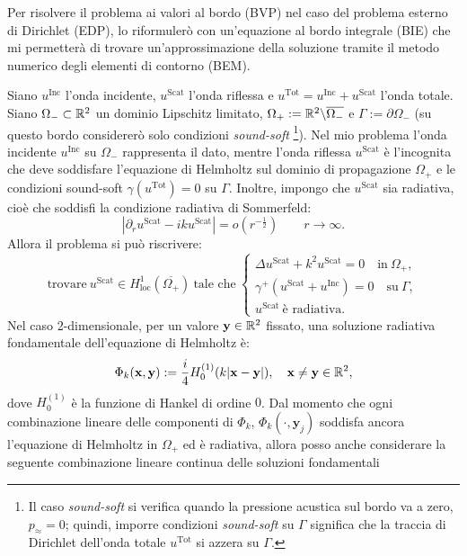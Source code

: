 Per risolvere il problema ai valori al bordo (BVP) nel caso del problema esterno di Dirichlet (EDP), lo riformulerò con un'equazione al bordo integrale (BIE) che mi permetterà di trovare un'approssimazione della soluzione tramite il metodo numerico degli elementi di contorno (BEM).

Siano $u^{\text{Inc}}$ l'onda incidente, $u^{\text{Scat}}$ l'onda riflessa e $u^{\text{Tot}} = u^{\text{Inc}} + u^{\text{Scat}} $ l'onda totale. Siano $\Omega_- \subset \mathbb{R}^2$ un dominio Lipschitz limitato, $\Omega_+ := \mathbb{R}^2 \backslash \overline{\Omega_-}$ e $\Gamma:= \partial \Omega_-$ (su questo bordo considererò solo condizioni \textit{sound-soft} \footnote{Il caso \textit{sound-soft} si verifica quando la pressione acustica sul bordo va a zero, $p_{\approx}=0$; quindi, imporre condizioni \textit{sound-soft} su $\Gamma$ significa che la traccia di Dirichlet dell'onda totale $u^{\text{Tot}}$ si azzera su $\Gamma$.}). Nel mio problema l'onda incidente $u^{\text{Inc}}$ su $\Omega_-$ rappresenta il dato, mentre l'onda riflessa $u^{\text{Scat}}$ è l'incognita che deve soddisfare l'equazione di Helmholtz sul dominio di propagazione $\Omega_+$ e le condizioni sound-soft $\gamma(u^{\text{Tot}}) = 0 $ su $\Gamma$. Inoltre, impongo che $u^{\text{Scat}}$ sia radiativa, cioè che soddisfi la condizione radiativa di Sommerfeld:
\begin{equation}
	|\partial_r u^{\text{Scat}} - iku^{\text{Scat}}| = o(r^{-\frac{1}{2}}) \qquad r \rightarrow \infty. 
\end{equation}
Allora il problema si può riscrivere:
\begin{equation}
	\text{trovare} \ u^{\text{Scat}} \in H^1_{\text{loc}} (\overline{\Omega_+}) \ \text{tale che} \ \begin{cases}
	\Delta u^{\text{Scat}} + k^2 u^{\text{Scat}} = 0 \quad \text{in} \ \Omega_+,\\
	\gamma^+(u^{\text{Scat}} + u^{\text{Inc}}) = 0 \quad \text{su} \ \Gamma,\\
	u^{\text{Scat}} \ \text{è radiativa}.
\end{cases}
\end{equation}
Nel caso 2-dimensionale, per un valore $\textbf{y} \in \mathbb{R}^2$ fissato, una soluzione radiativa fondamentale dell'equazione di Helmholtz è:
\begin{equation}
	\Phi_k(\textbf{x}, \textbf{y}) := \frac{i}{4} H^{(1)}_0 (k|\textbf{x}-\textbf{y}|), \quad \textbf{x} \ne \textbf{y} \in \mathbb{R}^2,
\end{equation}
dove $H^{(1)}_0$ è la funzione di Hankel di ordine $0$. Dal momento che ogni combinazione lineare delle componenti di $\Phi_k$, $\Phi_k(\cdot,\textbf{y}_j)$ soddisfa ancora l'equazione di Helmholtz in $\Omega_+$ ed è radiativa, allora posso anche considerare la seguente combinazione lineare continua delle soluzioni fondamentali
